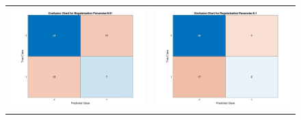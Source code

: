 \documentclass[11pt]{article}
\begin{document}
\begin{figure}[H]
	\centering
	\begin{adjustbox}{width=0.8\paperwidth}
		\begin{tabular}{c c}
			\includegraphics{Codes/Results/L1 Logistic Train/Conf_Chart_Reg_Par_0.01} & \includegraphics{Codes/Results/L1 Logistic Train/Conf_Chart_Reg_Par_0.1}\\ 

\end{tabular}
\end{adjustbox}
\end{figure}
\end{document}
